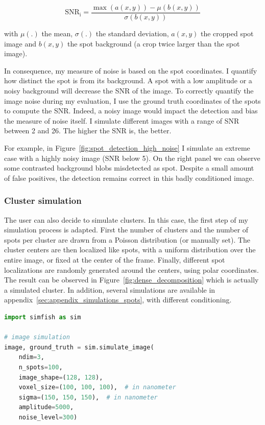 \begin{equation}
	{\displaystyle \operatorname{SNR_i} = \frac{\max(a(x, y)) - \mu(b(x, y))}{\sigma(b(x, y))}}
\end{equation}

\noindent
with $\mu(.)$ the mean, $\sigma(.)$ the standard deviation, $a(x, y)$ the cropped spot image and $b(x, y)$ the spot background (a crop twice larger than the spot image).

In consequence, my measure of noise is based on the spot coordinates.
I quantify how distinct the spot is from its background.
A spot with a low amplitude or a noisy background will decrease the \ac{SNR} of the image.
To correctly quantify the image noise during my evaluation, I use the ground truth coordinates of the spots to compute the \ac{SNR}.
Indeed, a noisy image would impact the detection and bias the measure of noise itself.
I simulate different images with a range of \ac{SNR} between 2 and 26.
The higher the \ac{SNR} is, the better.

For example, in Figure~\ref{fig:spot_detection_high_noise} I simulate an extreme case with a highly noisy image (\ac{SNR} below 5).
On the right panel we can observe some contrasted background blobs misdetected as spot.
Despite a small amount of false positives, the detection remains correct in this badly conditioned image.

\subsubsection{Cluster simulation}

The user can also decide to simulate clusters.
In this case, the first step of my simulation process is adapted.
First the number of clusters and the number of spots per cluster are drawn from a Poisson distribution (or manually set).
The cluster centers are then localized like spots, with a uniform distribution over the entire image, or fixed at the center of the frame.
Finally, different spot localizations are randomly generated around the centers, using polar coordinates.
The result can be observed in Figure~\ref{fig:dense_decomposition} which is actually a simulated cluster.
In addition, several simulations are available in appendix~\ref{sec:appendix_simulations_spots}, with different conditioning.\\

\begin{minipage}{0.9\textwidth}
\begin{lstlisting}[language=Python]
import simfish as sim

# image simulation
image, ground_truth = sim.simulate_image(
	ndim=3,
	n_spots=100,
	image_shape=(128, 128),
	voxel_size=(100, 100, 100),  # in nanometer
	sigma=(150, 150, 150),  # in nanometer
	amplitude=5000,
	noise_level=300)
\end{lstlisting}
\end{minipage}

